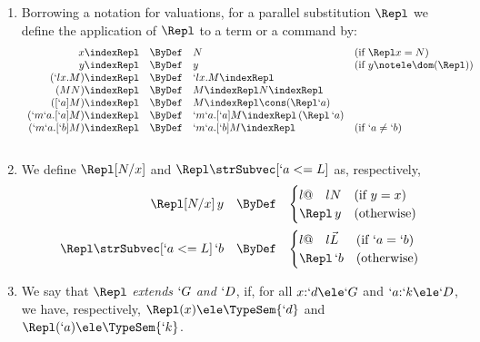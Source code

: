 \documentclass{lmcs}
\newcommand{\vect}[1]{\vec{#1}}
\begin{document}
 \begin{defi} \label{Repl definition}
 \begin{enumerate}

 \firstitem
A pair of partial mappings $ \Repl =\Pair{\Repl_1}{\Repl_2}: (\TVar\To\Terms) \times (\CVar\To\Terms^*)$, where we simply write $\Repl(x) = \Repl_1(x)$ and
$\Repl(`a) = \Repl_2(`a)$,
is a \emph{parallel substitution} if, for every $\textsl{p},\textsl{q} \ele \dom (\Repl) $, if $\textsl{p}\not=\textsl{q}$ then $\textsl{p} \notele \fv(\Repl \textsl{q})$ and $\textsl{p} \notele \fn(\Repl \textsl{q})$.

 \item
Borrowing a notation for valuations, for a parallel substitution $\Repl$ we define the application of $\Repl$ to a term or a command by:
%
\[ \begin{array}{rcl@{\quad}l}
x \indexRepl & \ByDef & N & (\textrm{if } \Repl x = N) 
	\\
y \indexRepl & \ByDef & y & (\textrm{if } y \notele \dom(\Repl) )
	\\
(`l x.M) \indexRepl & \ByDef & `l x.M \indexRepl 
	\\
(MN) \indexRepl & \ByDef & M \indexRepl N \indexRepl \\
([`a]M) \indexRepl & \ByDef & M \indexRepl \cons (\Repl `a) \\
(`m`a .[`a]M) \indexRepl &\ByDef & `m`a .[`a] M \indexRepl \, (\Repl \,`a) \\
 (`m`a .[`b]M) \indexRepl &\ByDef & `m`a .[`b] M \indexRepl & (\textrm{if } `a \neq `b) \\ 
 \\ 
 \end{array} \]

 \item
We define $ \Repl [ N/x ]$ and $ \Repl \strSubvec[ `a <= L ] $ as, respectively,
%
 \[ \begin{array}{rcl}
 \Repl [ N/x ] \, y &\ByDef& 
 \begin{cases}{l@{\quad}l}
N & (\textrm{if } y=x) \\
 \Repl \, y & (\textrm{otherwise})
 \end{cases}
 \\ [5mm]
 \Repl \strSubvec[ `a <= L ] \, `b &\ByDef& 
 \begin{cases}{l@{\quad}l}
 \vect{L} & (\textrm{if } `a=`b) \\
 \Repl \, `b & (\textrm{otherwise})
 \end{cases}
 \end{array} \]

 \item
We say that $\Repl$ \emph{extends} $`G$ \emph{and} $`D $, if, for all $x{:}`d \ele `G$
and $`a{:}`k \ele `D $, we have, respectively, $\Repl (x) \ele \TypeSem{`d}$ and $\Repl (`a) \ele \TypeSem{`k}$.

 \end{enumerate}
 \end{defi}
\end{document}
